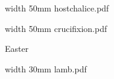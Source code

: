 \eject


\bigskip

\pdfximage width 50mm {hostchalice.pdf}

\centerline{\pdfrefximage \pdflastximage}



\bigskip

\eject


\paginaproxima


\bigskip

\pdfximage width 50mm {crucifixion.pdf}

\centerline{\pdfrefximage \pdflastximage}



\bigskip

\eject

\beginpart Easter


\bigskip


\eject


\bigskip


\eject


\bigskip



\bigskip

\pdfximage width 30mm {lamb.pdf}

\centerline{\pdfrefximage \pdflastximage}



\bigskip

\eject


\paginaproxima

